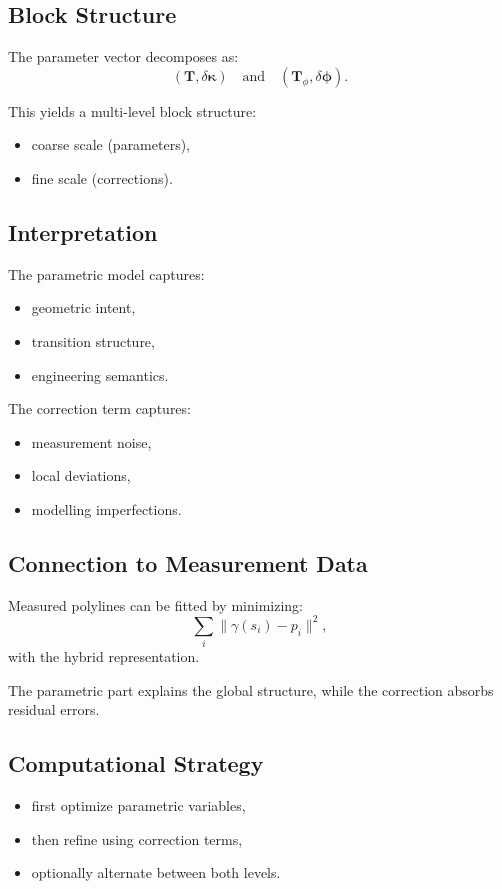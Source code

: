 \subsection{Block Structure}

The parameter vector decomposes as:
\[
(\mathbf{T}, \delta\boldsymbol{\kappa})
\quad \text{and} \quad
(\mathbf{T}_\phi, \delta\boldsymbol{\phi}).
\]

This yields a multi-level block structure:
\begin{itemize}
\item coarse scale (parameters),
\item fine scale (corrections).
\end{itemize}


\subsection{Interpretation}

The parametric model captures:
\begin{itemize}
\item geometric intent,
\item transition structure,
\item engineering semantics.
\end{itemize}

The correction term captures:
\begin{itemize}
\item measurement noise,
\item local deviations,
\item modelling imperfections.
\end{itemize}


\subsection{Connection to Measurement Data}

Measured polylines can be fitted by minimizing:
\[
\sum_i \|\gamma(s_i) - p_i\|^2,
\]
with the hybrid representation.

The parametric part explains the global structure, while the correction
absorbs residual errors.


\subsection{Computational Strategy}

\begin{itemize}
\item first optimize parametric variables,
\item then refine using correction terms,
\item optionally alternate between both levels.
\end{itemize}


